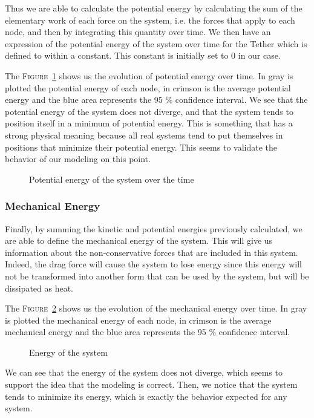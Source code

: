 Thus we are able to calculate the potential energy by calculating the sum of the elementary work of each force on the system, i.e. the forces that apply to each node, and then by integrating this quantity over time. We then have an expression of the potential energy of the system over time for the Tether which is defined to within a constant. This constant is initially set to $0$ in our case.

The \textsc{Figure}~\ref{fig:potential_energy} shows us the evolution of potential energy over time. In gray is plotted the potential energy of each node, in crimson is the average potential energy and the blue area represents the 95 \% confidence interval. We see that the potential energy of the system does not diverge, and that the system tends to position itself in a minimum of potential energy. This is something that has a strong physical meaning because all real systems tend to put themselves in positions that minimize their potential energy. This seems to validate the behavior of our modeling on this point.

\begin{figure}[!htb]
    \centering
    
    \caption{Potential energy of the system over the time}
    \label{fig:potential_energy}
\end{figure}

\subsubsection{Mechanical Energy}

Finally, by summing the kinetic and potential energies previously calculated, we are able to define the mechanical energy of the system. This will give us information about the non-conservative forces that are included in this system. Indeed, the drag force will cause the system to lose energy since this energy will not be transformed into another form that can be used by the system, but will be dissipated as heat.

The \textsc{Figure}~\ref{fig:energy} shows us the evolution of the mechanical energy over time. In gray is plotted the mechanical energy of each node, in crimson is the average mechanical energy and the blue area represents the 95 \% confidence interval.

\begin{figure}[!htb]
    \centering
    
    \caption{Energy of the system}
    \label{fig:energy}
\end{figure}

We can see that the energy of the system does not diverge, which seems to support the idea that the modeling is correct. Then, we notice that the system tends to minimize its energy, which is exactly the behavior expected for any system.